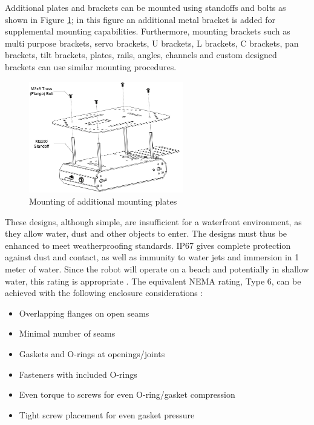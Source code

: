 Additional plates and brackets can be mounted using standoffs and bolts as shown in Figure \ref{fig:extra_chassis_mounting}; in this figure an additional metal bracket is added for supplemental mounting capabilities. Furthermore, mounting brackets such as multi purpose brackets, servo brackets, U brackets, L brackets, C brackets, pan brackets, tilt brackets, plates, rails, angles, channels and custom designed brackets can use similar mounting procedures. 

\begin{figure}[h]
    \centering
    \includegraphics[width=0.6\textwidth]{Sections/LiteratureReview/img/Chasis/MountingExtraParts.jpg}
    \caption{Mounting of additional mounting plates \cite{oreilly_building_nodate}}
    \label{fig:extra_chassis_mounting}
\end{figure}

These designs, although simple, are insufficient for a waterfront environment, as they allow water, dust and other objects to enter.
The designs must thus be enhanced to meet weatherproofing standards.
IP67 gives complete protection against dust and contact, as well as immunity to water jets and immersion in 1 meter of water. Since the robot will operate on a beach and potentially in shallow water, this rating is appropriate \cite{dstm_ip_nodate}.
The equivalent NEMA rating, Type 6, can be achieved with the following enclosure considerations \cite{carey_how_nodate}:

\begin{itemize}
    \item Overlapping flanges on open seams
    \item Minimal number of seams
    \item Gaskets and O-rings at openings/joints
    \item Fasteners with included O-rings
    \item Even torque to screws for even O-ring/gasket compression
    \item Tight screw placement for even gasket pressure
\end{itemize}


